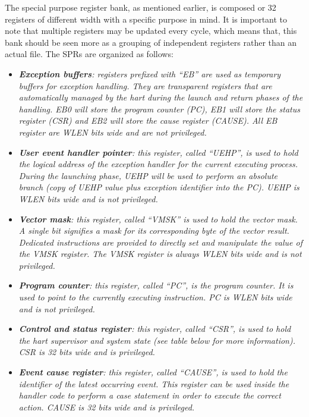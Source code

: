             The special purpose register bank, as mentioned earlier, is composed or 32 registers of different width with a specific purpose in mind. It is important to note that multiple registers may be updated every cycle, which means that, this bank should be seen more as a grouping of independent registers rather than an actual file. The SPRs are organized as follows:

            \begin{itemize}

                \item \textit{\textbf{Exception buffers}: registers prefixed with ``EB'' are used as temporary buffers for exception handling. They are transparent registers that are automatically managed by the hart during the launch and return phases of the handling. EB0 will store the program counter (PC), EB1 will store the status register (CSR) and EB2 will store the cause register (CAUSE). All EB register are WLEN bits wide and are not privileged.}

                \item \textit{\textbf{User event handler pointer}: this register, called ``UEHP'', is used to hold the logical address of the exception handler for the current executing process. During the launching phase, UEHP will be used to perform an absolute branch (copy of UEHP value plus exception identifier into the PC). UEHP is WLEN bits wide and is not privileged.}

                \item \textit{\textbf{Vector mask}: this register, called ``VMSK'' is used to hold the vector mask. A single bit signifies a mask for its corresponding byte of the vector result. Dedicated instructions are provided to directly set and manipulate the value of the VMSK register. The VMSK register is always WLEN bits wide and is not privileged.}

                \item \textit{\textbf{Program counter}: this register, called ``PC'', is the program counter. It is used to point to the currently executing instruction. PC is WLEN bits wide and is not privileged.}

                \item \textit{\textbf{Control and status register}: this register, called ``CSR'', is used to hold the hart supervisor and system state (see table below for more information). CSR is 32 bits wide and is privileged.}

                \item \textit{\textbf{Event cause register}: this register, called ``CAUSE'', is used to hold the identifier of the latest occurring event. This register can be used inside the handler code to perform a case statement in order to execute the correct action. CAUSE is 32 bits wide and is privileged.}


\end{itemize}
